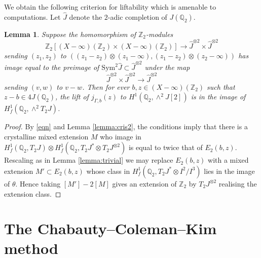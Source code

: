\documentclass[11pt]{amsart}
\def\Z{\mathbb Z}
\def\Q{\mathbb Q}
\theoremstyle{plain}
\newtheorem{lemma}{Lemma}
\theoremstyle{definition}
\newcommand{\Sym}{\mathrm{Sym}}
\begin{document}
We obtain the following criterion for liftability which is amenable to computations. Let $\widehat{J}$ denote the $2$-adic completion of $J(\Q _2 )$.

\begin{lemma}\label{lemma:cris_condition}
Suppose the homomorphism of $\Z _2 $-modules
\[
\Z _2 [(X-\infty )(\Z _2 )\times (X-\infty )(\Z _2 )]\to \widehat{J}^{\otimes 2} \times \widehat{J}^{\otimes 2}
\]
sending $(z_1 ,z_2 )$ to $((z_1 -z_2 )\otimes (z_1 -\infty ),(z_1 -z_2 )\otimes (z_2 -\infty ))$ has image equal to the preimage of $\Sym ^2 \widehat{J}\subset \widehat{J}^{\otimes 2}$ under the map
\[
\widehat{J}^{\otimes 2}\times \widehat{J}^{\otimes 2} \to \widehat{J}^{\otimes 2}
\]
sending $(v,w)$ to $v-w$. Then for ever $b,z\in (X-\infty )(\Z _2 )$ such that $z-b\in 4J(\Q _2 )$, the lift of $j_{\Gamma ,b}(z)$ to $H^1 (\Q _2 ,\wedge ^2 J[2])$ is in the image of $H^1 _f (\Q _2 ,\wedge ^2 T_2 J)$.
\end{lemma}
\begin{proof}
By \eqref{eqn} and Lemma \ref{lemma:cris2}, the conditions imply that there is a crystalline mixed extension $M$ who image in $H^1 _f (\Q _2 ,T_2 J)\otimes H^1 _f (\Q _2 ,T_2 J ^* \otimes T_2 J^{\otimes 2})$ is equal to twice that of $E_2 (b,z)$. Rescaling as in Lemma \ref{lemma:trivial} we may replace $E_2 (b,z)$ with a mixed extension $M'\subset E_2 (b,z)$ whose class in $H^1 _f (\Q _2 ,T_2 J^* \otimes I^2 /I^3 )$ lies in the image of $\theta $. Hence taking $[M']-2[M]$ gives an extension of $\Z _2 $ by $T_2 J^{\otimes 2}$ realising the extension class.
\end{proof}

\section{The Chabauty--Coleman--Kim method}
\end{document}
